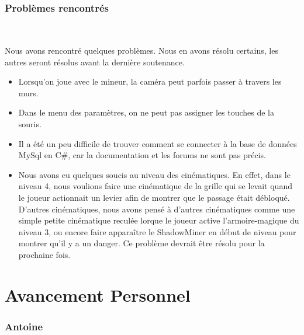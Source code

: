 \documentclass[titlepage, 13px, a4paper]{report}
\begin{document}
\newpage
\section{Problèmes rencontrés}
\paragraph{} \hspace{0pt} \\
Nous avons rencontré quelques problèmes. Nous en avons résolu certains, les autres seront résolus avant la dernière soutenance.

{\begin{itemize}
	\item Lorsqu’on joue avec le mineur, la caméra peut parfois passer à travers les murs. \\
	\item Dans le menu des paramètres, on ne peut pas assigner les touches de la souris. \\
	\item Il a été un peu difficile de trouver comment se connecter à la base de données MySql en C\#, car 
		la documentation et les forums ne sont pas précis. \\
	\item  Nous avons eu quelques soucis au niveau des cinématiques. En effet, dans le niveau 4, 
	nous voulions faire une cinématique de la grille 
	qui se levait quand le joueur actionnait un levier afin de montrer que le passage était débloqué.  \\
	D’autres cinématiques, nous avons pensé à d'autres cinématiques comme une simple petite cinématique reculée 
	lorque le joueur active l’armoire-magique du niveau 3, ou encore faire apparaître le 
	ShadowMiner en début de niveau pour montrer qu'il y a un danger. 
	Ce problème devrait être résolu pour la prochaine fois.
\end{itemize}} 

\newpage




\part{Avancement Personnel}  
\section{Antoine}
\end{document}

